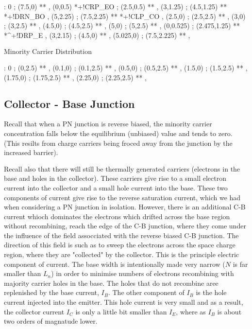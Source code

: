 \documentclass[a4paper,12pt]{article}
\begin{document}
\begin{table}[hbtp]

\vspace{10mm}

\xy <1cm,0cm>:
0 ; (7.5,0) **\dir{-} ,
(0,0.5) *+!CR{P_{EO}} ; (2.5,0.5) **\dir{--} ,
(3,1.25) ; (4.5,1.25) **\dir{--} *+!DR{N_{BO}} ,
(5,2.25) ; (7.5,2.25) **\dir{--} *+!CL{P_{CO}} ,
(2.5,0) ; (2.5,2.5) **\dir{--} ,
(3,0) ; (3,2.5) **\dir{--} ,
(4.5,0) ; (4.5,2.5) **\dir{--} ,
(5,0) ; (5,2.5) **\dir{--} ,
(0,0.525) ; (2.475,1.25) ** *^+!DR{P_{E}} ,
(3,2.15) ; (4.5,0) ** ,
(5.025,0) ; (7.5,2.225) ** ,
\endxy

\caption{Minority Carrier Distribution}

\end{table}

\begin{table}[hbtp]

\vspace{10mm}

\xy <1cm,0cm>:
0 ; (0,2.5) **\dir{--} ,
(0.1,0) ; (0.1,2.5) **\dir{-} ,
(0.5,0) ; (0.5,2.5) **\dir{--} , 
(1.5,0) ; (1.5,2.5) **\dir{--} ,
(1.75,0) ; (1.75,2.5) **\dir{-} ,
(2.25,0) ; (2.25,2.5) **\dir{--} ,
\endxy

\end{table}

\subsection{Collector - Base Junction}

Recall that when a PN junction is reverse biased, the minority
carrier concentration falls below the equilibrium (unbiased) value and
tends to zero. (This resilts from charge carriers being froced away from 
the junction by the increased barrier).

Recall also that there will still be thermally generated
carriers (electrons in the base and holes in the collector). These
carriers give rise to a small electron current into the collector and a
small hole current into the base. These two components of current give
rise to the reverse saturation current, which we had when considering a
PN junction in isolation. However, there is an additional C-B current
whioch dominates the electrons which drifted across the base region
without recombining, reach the edge of the C-B junction, where they come
under the influence of the field assocciated with the reverse biased C-B
junction. The direction of this field is such as to sweep the electrons
across the space charge region, where they are "collected" by the
collector. This is the principle electric component of current. The base
width is intentionally made very narrow ($N$ is far smaller than
$L_{n}$) in order to minimise numbers of electrons recombining with
majority carrier holes in the base. The holes that do not recombine aree
replenished by the base current, $I_{B}$. The other component of $I_{B}$
is the hole current injected into the emitter. This hole current is very
small and as a result, the collector current $I_{C}$ is only a little
bit smaller than $I_{E}$, where as $I_{B}$ is about two orders of
magnatude lower.
\end{document}
